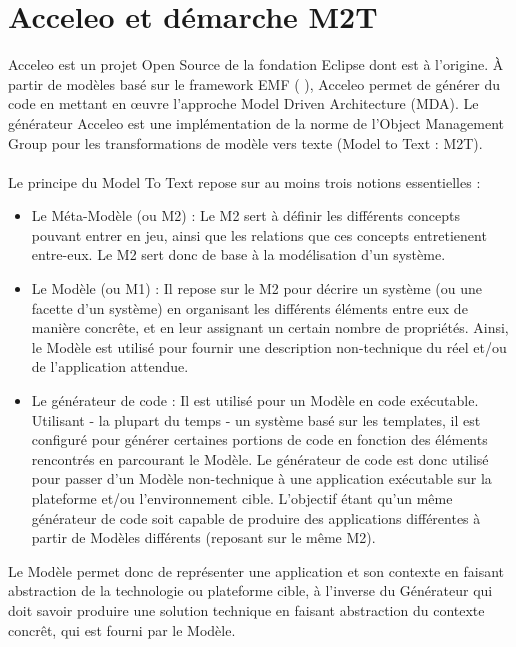 \section{Acceleo et démarche M2T}
Acceleo est un projet Open Source de la fondation Eclipse dont \kwobeo{} est à l'origine. À partir de modèles basé sur le framework EMF (\cf{} \cite{emf}), Acceleo permet de générer du code en mettant en œuvre l'approche Model Driven Architecture (MDA). Le générateur Acceleo est une implémentation de la norme de l'Object Management Group \cite{omg} pour les transformations de modèle vers texte (Model to Text : M2T).
\\\\
Le principe du Model To Text repose sur au moins trois notions essentielles :
\begin{itemize}
\item Le Méta-Modèle (ou M2) : Le M2 sert à définir les différents concepts pouvant entrer en jeu, ainsi que les relations que ces concepts entretienent entre-eux. Le M2 sert donc de base à la modélisation d'un système.
\item Le Modèle (ou M1) : Il repose sur le M2 pour décrire un système (ou une facette d'un système) en organisant les différents éléments entre eux de manière concrête, et en leur assignant un certain nombre de propriétés. Ainsi, le Modèle est utilisé pour fournir une description non-technique du réel et/ou de l'application attendue.
\item Le générateur de code : Il est utilisé pour  un Modèle en code exécutable. Utilisant - la plupart du temps - un système basé sur les templates, il est configuré pour générer certaines portions de code en fonction des éléments rencontrés en parcourant le Modèle. Le générateur de code est donc utilisé pour passer d'un Modèle non-technique à une application exécutable sur la plateforme et/ou l'environnement cible. L'objectif étant qu'un même générateur de code soit capable de produire des applications différentes à partir de Modèles différents (reposant sur le même M2).\\
\end{itemize}

Le Modèle permet donc de représenter une application et son contexte en faisant abstraction de la technologie ou plateforme cible, à l'inverse du Générateur qui doit savoir produire une solution technique en faisant abstraction du contexte concrêt, qui est fourni par le Modèle.




